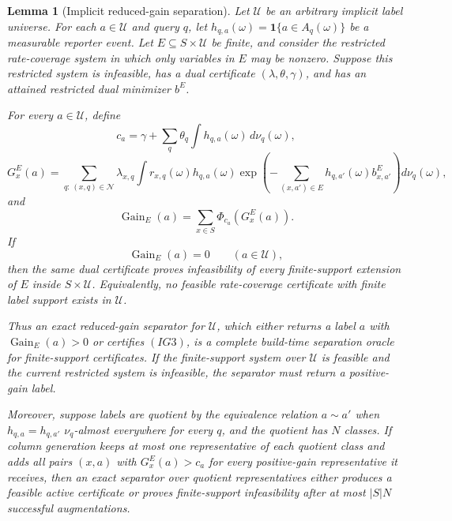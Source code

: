 \documentclass[10pt]{article}
\newtheorem{lemma}[theorem]{Lemma}
\theoremstyle{definition}
\begin{document}
\begin{lemma}[Implicit reduced-gain separation]
   \label{lem:implicit-reduced-gain-separation}
   Let \(\mathcal U\) be an arbitrary implicit label universe.  For each
   \(a\in\mathcal U\) and query \(q\), let
   \(h_{q,a}(\omega)=\mathbf 1\{a\in A_q(\omega)\}\) be a measurable reporter
   event.  Let \(E\subseteq S\times\mathcal U\) be finite, and consider the
   restricted rate-coverage system in which only variables in \(E\) may be
   nonzero.  Suppose this restricted system is infeasible, has a dual
   certificate \((\lambda,\theta,\gamma)\), and has an attained restricted
   dual minimizer \(b^E\).

   For every \(a\in\mathcal U\), define
   \[
      c_a=\gamma+\sum_q\theta_q\int h_{q,a}(\omega)\,d\nu_q(\omega),
      \tag{IG0}
   \]
   \[
      G_x^E(a)
      =
      \sum_{q:\,(x,q)\in\mathcal N}
      \lambda_{x,q}
      \int
      r_{x,q}(\omega)h_{q,a}(\omega)
      \exp\!\left(
         -\sum_{(x,a')\in E}
         h_{q,a'}(\omega)b^E_{x,a'}
      \right)d\nu_q(\omega),
      \tag{IG1}
   \]
   and
   \[
      \operatorname{Gain}_E(a)
      =
      \sum_{x\in S}\Phi_{c_a}\!\left(G_x^E(a)\right).
      \tag{IG2}
   \]
   If
   \[
      \operatorname{Gain}_E(a)=0
      \qquad(a\in\mathcal U),
      \tag{IG3}
   \]
   then the same dual certificate proves infeasibility of every finite-support
   extension of \(E\) inside \(S\times\mathcal U\).  Equivalently, no feasible
   rate-coverage certificate with finite label support exists in
   \(\mathcal U\).

   Thus an exact reduced-gain separator for \(\mathcal U\), which either
   returns a label \(a\) with \(\operatorname{Gain}_E(a)>0\) or certifies
   \((IG3)\), is a complete build-time separation oracle for finite-support
   certificates.  If the finite-support system over \(\mathcal U\) is feasible
   and the current restricted system is infeasible, the separator must return a
   positive-gain label.

   Moreover, suppose labels are quotient by the equivalence relation
   \(a\sim a'\) when
   \(h_{q,a}=h_{q,a'}\) \(\nu_q\)-almost everywhere for every \(q\), and the
   quotient has \(N\) classes.  If column generation keeps at most one
   representative of each quotient class and adds all pairs
   \((x,a)\) with \(G_x^E(a)>c_a\) for every positive-gain representative it
   receives, then an exact separator over quotient representatives either
   produces a feasible active certificate or proves finite-support
   infeasibility after at most \(|S|N\) successful augmentations.
\end{lemma}
\end{document}
